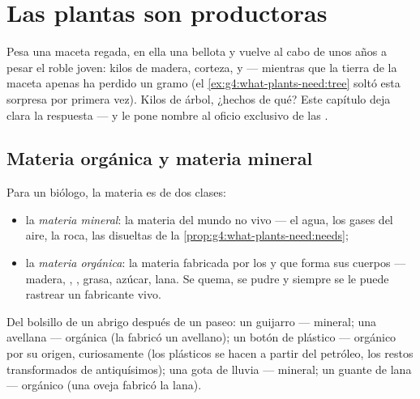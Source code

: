 \chapter{Las plantas son productoras}\label{ch:g6:plants-are-producers}

Pesa una maceta regada,  en ella una bellota y vuelve al cabo de
unos años a pesar el roble joven: kilos de madera, corteza,  y 
--- mientras que la tierra de la maceta apenas ha perdido un gramo (el
\cref{ex:g4:what-plants-need:tree} soltó esta sorpresa por primera
vez). Kilos de árbol, ¿hechos de qué? Este capítulo deja clara la
respuesta --- y le pone nombre al oficio exclusivo de las .

\section{Materia orgánica y materia mineral}

\begin{definition}\label{def:g6:plants-are-producers:matter}
Para un biólogo, la materia es de dos clases:
\begin{itemize}
  \item la \emph{materia mineral}: la materia
        del mundo no vivo --- el agua, los gases del aire, la roca, las
         disueltas de la
        \cref{prop:g4:what-plants-need:needs};
  \item la \emph{materia orgánica}: la materia
        fabricada por los  y que forma sus cuerpos ---
        madera, , , grasa, azúcar, lana. Se quema, se pudre
        y siempre se le puede rastrear un fabricante vivo.
\end{itemize}
\end{definition}

\begin{example}\label{ex:g6:plants-are-producers:sorting}
Del bolsillo de un abrigo después de un paseo: un guijarro ---
mineral; una avellana --- orgánica (la fabricó un avellano); un botón
de plástico --- orgánico por su origen, curiosamente (los plásticos se
hacen a partir del petróleo, los restos transformados de 
antiquísimos); una gota de lluvia --- mineral; un guante de lana ---
orgánico (una oveja fabricó la lana).
\end{example}

